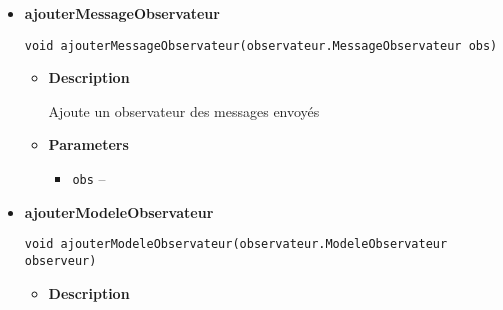 \documentclass[11pt,a4paper]{report}
\begin{document}
{{{{\begin{itemize}
{\begin{itemize}
{Ajoute un observateur à l'annulation d'une commande
}
\item{
{\bf  Parameters}
  \begin{itemize}
   \item{
\texttt{annulerCommandeObserveur} -- }
  \end{itemize}
}%
\end{itemize}
}%
\item{ 
\hypertarget{controleur.ControleurInterface.ajouterMessageObservateur(controleur.observateur.MessageObservateur)}{{\bf  ajouterMessageObservateur}\\}
\begin{lstlisting}[frame=none]
void ajouterMessageObservateur(observateur.MessageObservateur obs)\end{lstlisting} %
\begin{itemize}
\item{
{\bf  Description}

Ajoute un observateur des messages envoyés
}
\item{
{\bf  Parameters}
  \begin{itemize}
   \item{
\texttt{obs} -- }
  \end{itemize}
}%
\end{itemize}
}%
\item{ 
\hypertarget{controleur.ControleurInterface.ajouterModeleObservateur(controleur.observateur.ModeleObservateur)}{{\bf  ajouterModeleObservateur}\\}
\begin{lstlisting}[frame=none]
void ajouterModeleObservateur(observateur.ModeleObservateur observeur)\end{lstlisting} %
\begin{itemize}
\item{
{\bf  Description}

}
\end{itemize}}
\end{itemize}}}}}
\end{document}
